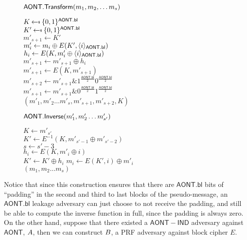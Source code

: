 \documentclass[11pt,twoside]{article}
\begin{document}
\begin{figure}[H]
{
\underline{$\mathsf{AONT.Transform}(m_1,m_2,\dots m_s)$}

\begin{algorithm}[H]
$K\getsr \bits^\schemefont{AONT.bl}$\\
$K'\getsr \bits^\schemefont{AONT.bl}$\\
$m'_{s+1}\gets K'$\\
{
$m'_i\gets m_i \oplus E(K',\langle i \rangle_{\mathsf{AONT.bl}})$\\
$h_i\gets E(K,m'_i\oplus \langle i \rangle_{\mathsf{AONT.bl}})$\\
$m'_{s+1}\gets m'_{s+1}\oplus h_i$\\
}
$m'_{s+1}\gets E(K,m'_{s+1})$\\
$m'_{s+2}\gets m'_{s+1} \mathrel{\&} 1^{\frac{\mathsf{AONT.bl}}{2}}0^{\frac{\mathsf{AONT.bl}}{2}}$\\
$m'_{s+1}\gets m'_{s+1} \mathrel{\&} 0^{\frac{\mathsf{AONT.bl}}{2}}1^{\frac{\mathsf{AONT.bl}}{2}}$\\
\Return $(m'_1,m'_2\dots m'_s, m'_{s+1}, m'_{s+2}, K)$
\end{algorithm}
}
{
\underline{$\mathsf{AONT.Inverse}(m'_1,m'_2\dots m'_{s'})$}

\begin{algorithm}[H]
$K\gets m'_{s'}$\\
$K'\gets E^{-1}(K,m'_{s'-1} \oplus m'_{s'-2})$\\
$s\gets s'-3$\\
{
$h_i\gets E(K,m'_i\oplus i)$\\
$K'\gets K'\oplus h_i$
}
{
$m_i\gets E(K',i)\oplus m'_i$\\
}
\Return $(m_1,m_2\dots m_{s})$
\end{algorithm}
}
\end{figure} 

Notice that since this construction ensures that there are $\mathsf{AONT.bl}$ bits of ``padding'' in the second and third to last blocks of the pseudo-message, an $\mathsf{AONT.bl}$ leakage adversary can just choose to not receive the padding, and still be able to compute the inverse function in full, since the padding is always zero. On the other hand, suppose that there existed a $\mathsf{AONT-IND}$ adversary against $\mathsf{AONT}$, $A$, then we can construct $B$, a PRF adversary against block cipher $E$. 
\end{document}
